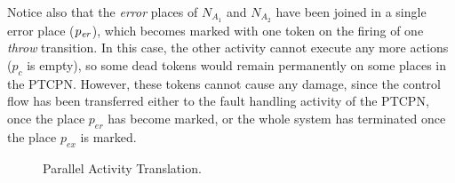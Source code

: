 \begin{itemize}
Notice also that the {\em error} places of ${N}_{A_{1}}$ and $N_{A_{2}}$
have been joined in a single error place ($p_{\it er}$),
which becomes marked with one token on
the firing of one {\em throw} transition. 
In this case, the other activity cannot execute any
more actions ($p_c$ is empty), so some dead tokens would
remain permanently on some places in the PTCPN.
However, these tokens cannot cause
any damage, since the control flow has been
transferred either to the fault handling activity of the PTCPN, 
once the place $p_{er}$ has become marked, or the whole system has terminated once 
the place $p_{ex}$ is marked. %
\begin{figure}[!ht]
\vspace{-0.75cm}
\begin{center}
\end{center}
\vspace{-0.7cm}
\caption{\label{par} Parallel Activity Translation.}
\vspace{-0.5cm}
\end{figure}


\end{itemize}
